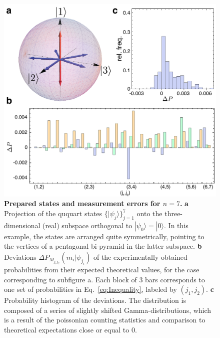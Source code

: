 \documentclass[aps,prl,floatfix,onecolumn,tightenlines,amsmath,amssymb,nofootinbib,12pt]{revtex4-2}
\newcommand{\ket}[1] {| #1 \rangle}
\begin{document}
\begin{figure}[ht!]
\begin{center}
\includegraphics[width=\columnwidth]{Figure_4.pdf}
\end{center}
\vspace{-1.5em}
\caption{\textbf{Prepared states and measurement errors for $n=7$.} \textbf{a} Projection of the ququart states $\{\ket{\psi_j}\}_{j=1}^7$ onto the three-dimensional (real) subspace orthogonal to $\ket{\psi_0}=\ket{0}$. In this example, the states are arranged quite symmetrically, pointing to the vertices of a pentagonal bi-pyramid in the latter subspace. \textbf{b} Deviations $\Delta P_{M_{j_1j_2}}(m_i | \psi_{j_i})$ of the experimentally obtained probabilities from their expected theoretical values, for the case corresponding to subfigure a. Each block of $3$ bars corresponds to one set of probabilities in Eq.~\eqref{eq:Inequality}, labeled by $(j_1,j_2)$. \textbf{c} Probability histogram of the deviations. The distribution is composed of a series of slightly shifted Gamma-distributions, which is a result of the poissonian counting statistics and comparison to theoretical expectations close or equal to $0$.}
  \label{fig:errors}
\end{figure}
\end{document}
